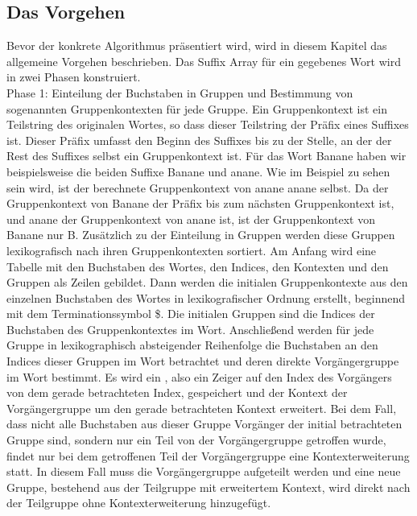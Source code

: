 \newpage
\subsection{Das Vorgehen}
\label{gsaca:chapter2}
%
Bevor der konkrete Algorithmus präsentiert  wird, wird in diesem Kapitel das allgemeine Vorgehen beschrieben. 
Das Suffix Array für ein gegebenes Wort wird in zwei Phasen konstruiert.\\

Phase 1: Einteilung der Buchstaben in Gruppen und Bestimmung von sogenannten Gruppenkontexten für jede Gruppe. 
Ein Gruppenkontext ist ein Teilstring des originalen Wortes, so dass dieser Teilstring der Präfix eines Suffixes ist. 
Dieser Präfix umfasst den Beginn des Suffixes bis zu der Stelle, an der der Rest des Suffixes selbst ein Gruppenkontext ist. 
Für das Wort Banane haben wir beispielsweise die beiden Suffixe Banane und anane. 
Wie im Beispiel zu sehen sein wird, ist der berechnete Gruppenkontext von anane anane selbst. 
Da der Gruppenkontext von Banane der Präfix bis zum nächsten Gruppenkontext ist, und anane der Gruppenkontext von anane ist, ist der Gruppenkontext von Banane nur B. 
Zusätzlich zu der Einteilung in Gruppen werden diese Gruppen lexikografisch nach ihren Gruppenkontexten sortiert. 
Am Anfang wird eine Tabelle mit den Buchstaben des Wortes, den Indices, den Kontexten und den Gruppen als Zeilen gebildet. 
Dann werden die initialen Gruppenkontexte aus den einzelnen Buchstaben des Wortes in lexikografischer Ordnung erstellt, beginnend mit dem Terminationssymbol \$. 
Die initialen Gruppen sind die Indices der Buchstaben des Gruppenkontextes im Wort. 
Anschließend werden für jede Gruppe in lexikographisch absteigender Reihenfolge die Buchstaben an den Indices dieser Gruppen im Wort betrachtet und deren direkte Vorgängergruppe im Wort bestimmt. 
Es wird ein \prevpointer, also ein Zeiger auf den Index des Vorgängers von dem gerade betrachteten Index, gespeichert und der Kontext der Vorgängergruppe um den gerade betrachteten Kontext erweitert. 
Bei dem Fall, dass nicht alle Buchstaben aus dieser Gruppe Vorgänger der initial betrachteten Gruppe sind, sondern nur ein Teil von der Vorgängergruppe getroffen wurde, findet nur bei dem getroffenen Teil der Vorgängergruppe eine Kontexterweiterung statt. 
In diesem Fall muss die Vorgängergruppe aufgeteilt werden und eine neue Gruppe, bestehend aus der Teilgruppe mit erweitertem Kontext, wird direkt nach der Teilgruppe ohne Kontexterweiterung hinzugefügt. \\

